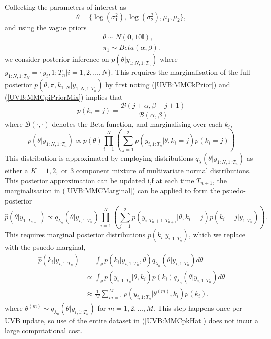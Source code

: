 \documentclass[12pt,a4paper]{article}\usepackage[]{graphicx}\usepackage[]{color}
\begin{document}
Collecting the parameters of interest as
\begin{equation}
\label{UVB:MMCtheta}
\theta = \{\log(\sigma^2_1), \log(\sigma^2_2), \mu_1, \mu_2 \},
\end{equation}
and using the vague priors
\begin{align}
\theta \sim N(\boldsymbol{0}, 10 \mathbb{I}), \\
\pi_1 \sim Beta(\alpha, \beta). \label{UVB:MMCpiPriorMix}
\end{align}
we consider posterior inference on $p(\theta | y_{1:N, 1:T_n})$ where $y_{1:N, 1:T_N} = \{y_i, 1:T_n | i = 1, 2, \dots, N\}$. This requires the marginalisation of the full posterior $p(\theta, \pi, k_{1:N} | y_{1:N, 1:T_n})$ by first noting (\ref{UVB:MMCkPrior}) and (\ref{UVB:MMCpiPriorMix}) implies that
\begin{equation}
\label{UVB:MMCkMarginalMix}
p(k_i = j) = \frac{\mathcal{B}(j + \alpha, \beta - j + 1)}{\mathcal{B}(\alpha, \beta)}
\end{equation}
where $\mathcal{B}(\cdot, \cdot)$ denotes the Beta function, and marginalising over each $k_i$,
\begin{equation}
\label{UVB:MMCMarginal}
p(\theta | y_{1:N, 1:T_n}) \propto p(\theta) \prod_{i=1}^N \left( \sum_{j=1}^2 p(y_{i, 1:T_n} | \theta, k_i = j) p(k_i = j) \right)
\end{equation}
This distribution is approximated by employing distributions $q_{\lambda}(\theta | y_{1:N, 1:T_n})$ as either a $K = 1, 2,$ or $3$ component mixture of multivariate normal distributions. 
\\

This posterior approximation can be updated i,f at each time $T_{n+1}$, the marginalisation in (\ref{UVB:MMCMarginal}) can be applied to form the psuedo-posterior
\begin{equation}
\label{UVB:MMCUpdate}
\hat{p}(\theta | y_{1:T_{n+1}}) \propto q_{\lambda_{n}}(\theta | y_{i, 1:T_{n}}) \prod_{i=1}^N \left( \sum_{j=1}^2 p(y_{i, T_n+1:T_{n+1}} | \theta, k_i = j) p(k_i = j | y_{1:T_n}) \right).
\end{equation}
This requires marginal posterior distributions $p(k_i | y_{i, 1:T_{n}})$, which we replace with the psuedo-marginal,
\begin{align}
\hat{p}(k_i | y_{i, 1:T_{n}}) &= \int_{\theta} p(k_i | y_{i, 1:T_{n}}, \theta)q_{\lambda_{n}}(\theta | y_{i, 1:T_{n}}) d\theta \nonumber \\
&\propto \int_{\theta} p(y_{i, 1:T_n} | \theta, k_i) p(k_i) q_{\lambda_{n}}(\theta | y_{i, 1:T_{n}}) d\theta \nonumber \\
&\approx \frac{1}{M} \sum_{m=1}^M p(y_{i, 1:T_n} | \theta^{(m)} , k_i) p(k_i). \label{UVB:MMCpkHat}
\end{align}
where $\theta^{(m)} \sim q_{\lambda_{n}}(\theta | y_{i, 1:T_{n}})$ for $m = 1, 2, \ldots, M$. This step happens once per UVB update, so use of the entire dataset in (\ref{UVB:MMCpkHat}) does not incur a large computational cost.
\\
\end{document}
